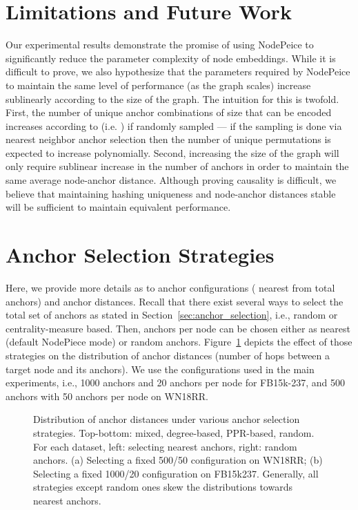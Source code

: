 \documentclass{article} \usepackage{iclr2022_conference,times}
\begin{document}
\section{Limitations and Future Work}
\label{app:limits}
Our experimental results demonstrate the promise of using NodePeice to significantly reduce the parameter complexity of node embeddings. While it is difficult to prove, we  also hypothesize that the parameters required by NodePeice to maintain the same level of performance (as the graph scales) increase sublinearly according to the size of the graph. The intuition for this is twofold. First, the number of unique anchor combinations of size  that can be encoded increases according to  (i.e. ) if randomly sampled --- if the sampling is done via nearest neighbor anchor selection then the number of unique permutations is expected to increase polynomially. Second, increasing the size of the graph will only require sublinear increase in the number of anchors in order to maintain the same average node-anchor distance. Although proving causality is difficult, we believe that maintaining hashing uniqueness and node-anchor distances stable will be sufficient to maintain equivalent performance. 






\section{Anchor Selection Strategies}
\label{app:anchors}

Here, we provide more details as to anchor configurations ( nearest from total  anchors) and anchor distances. 
Recall that there exist several ways to select the total set of anchors  as stated in Section~\ref{sec:anchor_selection}, i.e., random or centrality-measure based.
Then,  anchors per node can be chosen either as  nearest (default NodePiece mode) or  random anchors.
Figure~\ref{fig:app_anchor_sel} depicts the effect of those strategies on the distribution of anchor distances (number of hops between a target node and its anchors). 
We use the configurations used in the main experiments, i.e.,  1000 anchors and 20 anchors per node for FB15k-237, and 500 anchors with 50 anchors per node on WN18RR.


\begin{figure}[t]
    \centering
    \caption{Distribution of anchor distances under various anchor selection strategies. Top-bottom: mixed, degree-based, PPR-based, random. For each dataset, left: selecting  nearest anchors, right:  random anchors. (a) Selecting a fixed 500/50 configuration on WN18RR; (b) Selecting a fixed 1000/20 configuration on FB15k237. Generally, all strategies except random ones skew the distributions towards nearest anchors. }
    \label{fig:app_anchor_sel}
\end{figure}
\end{document}
